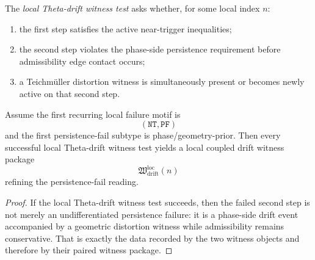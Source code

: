 \begin{definition}
\label{def:local-theta-drift-witness-test}
The \emph{local Theta-drift witness test} asks whether, for some local index \(n\):
\begin{enumerate}
 \item the first step satisfies the active near-trigger inequalities;
 \item the second step violates the phase-side persistence requirement before admissibility edge contact occurs;
 \item a Teichm\"uller distortion witness is simultaneously present or becomes newly active on that second step.
\end{enumerate}
\end{definition}

\begin{proposition}
\label{prop:theta-drift-witness-packages-refine-default-persistence-fail-reading}
Assume the first recurring local failure motif is
\[
(\mathtt{NT},\mathtt{PF})
\]
and the first persistence-fail subtype is phase/geometry-prior.
Then every successful local Theta-drift witness test yields a local coupled drift witness package
\[
\mathfrak{W}_{\mathrm{drift}}^{\mathrm{loc}}(n)
\]
refining the persistence-fail reading.
\end{proposition}

\begin{proof}
If the local Theta-drift witness test succeeds, then the failed second step is not merely an undifferentiated persistence failure: it is a phase-side drift event accompanied by a geometric distortion witness while admissibility remains conservative.
That is exactly the data recorded by the two witness objects and therefore by their paired witness package.
\end{proof}


